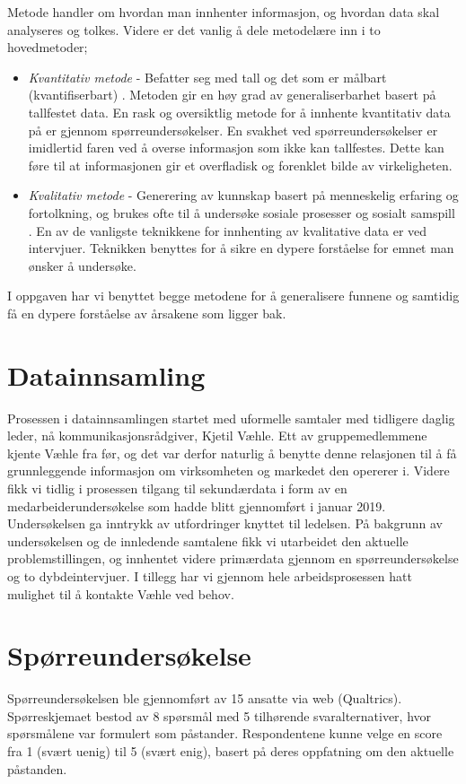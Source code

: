Metode handler om hvordan man innhenter informasjon, og hvordan data skal analyseres og tolkes. Videre er det vanlig å dele metodelære inn i to hovedmetoder;
\begin{itemize}
\item\textit{Kvantitativ metode} - Befatter seg med tall og det som er målbart (kvantifiserbart) \cite{kvantitativMetode}. Metoden gir en høy grad av generaliserbarhet basert på tallfestet data. En rask og oversiktlig metode for å innhente kvantitativ data på er gjennom spørreundersøkelser. En svakhet ved spørreundersøkelser er imidlertid faren ved å overse informasjon som ikke kan tallfestes. Dette kan føre til at informasjonen gir et overfladisk og forenklet bilde av virkeligheten.
\item\textit{Kvalitativ metode} - Generering av kunnskap basert på menneskelig erfaring og fortolkning, og brukes ofte til å undersøke sosiale prosesser og sosialt samspill  \cite{kvalitativMetode}. En av de vanligste teknikkene for innhenting av kvalitative data er ved intervjuer. Teknikken benyttes for å sikre en dypere forståelse for emnet man ønsker å undersøke.
\end{itemize}

I oppgaven har vi benyttet begge metodene for å generalisere funnene og samtidig få en dypere forståelse av årsakene som ligger bak. 

\section{Datainnsamling}
Prosessen i datainnsamlingen startet med uformelle samtaler med tidligere daglig leder, nå kommunikasjonsrådgiver, Kjetil Væhle. Ett av gruppemedlemmene kjente Væhle fra før, og det var derfor naturlig å benytte denne relasjonen til å få grunnleggende informasjon om virksomheten og markedet den opererer i. Videre fikk vi tidlig i prosessen tilgang til sekundærdata i form av en medarbeiderundersøkelse som hadde blitt gjennomført i januar 2019. Undersøkelsen ga inntrykk av utfordringer knyttet til ledelsen. På bakgrunn av undersøkelsen og de innledende samtalene fikk vi utarbeidet den aktuelle problemstillingen, og innhentet videre primærdata gjennom en spørreundersøkelse og to dybdeintervjuer. I tillegg har vi gjennom hele arbeidsprosessen hatt mulighet til å kontakte Væhle ved behov.

\section{Spørreundersøkelse}
Spørreundersøkelsen ble gjennomført av 15 ansatte via web (Qualtrics). Spørreskjemaet bestod av 8 spørsmål med 5 tilhørende svaralternativer, hvor spørsmålene var formulert som påstander. Respondentene kunne velge en score fra 1 (svært uenig) til 5 (svært enig), basert på deres oppfatning om den aktuelle påstanden. 

